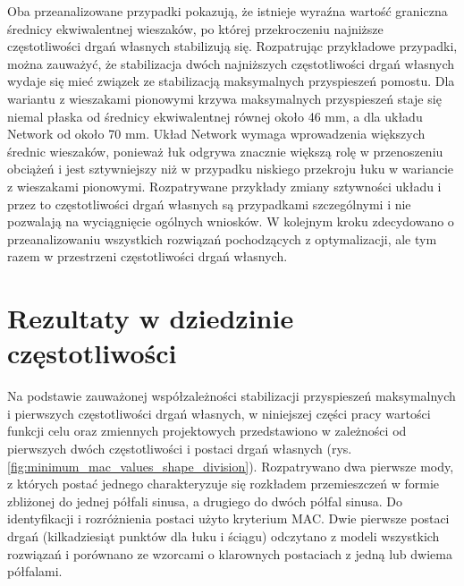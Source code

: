Oba przeanalizowane przypadki pokazują, że istnieje wyraźna wartość graniczna średnicy ekwiwalentnej wieszaków, po której przekroczeniu najniższe częstotliwości drgań własnych stabilizują się. Rozpatrując przykładowe przypadki, można zauważyć, że stabilizacja dwóch najniższych częstotliwości drgań własnych wydaje się mieć związek ze stabilizacją maksymalnych przyspieszeń pomostu. Dla wariantu z wieszakami pionowymi krzywa maksymalnych przyspieszeń staje się niemal płaska od średnicy ekwiwalentnej równej około 46 mm, a dla układu Network od około 70 mm. Układ Network wymaga wprowadzenia większych średnic wieszaków, ponieważ łuk odgrywa znacznie większą rolę w przenoszeniu obciążeń i jest sztywniejszy niż w przypadku niskiego przekroju łuku w wariancie z wieszakami pionowymi. Rozpatrywane przykłady zmiany sztywności układu i przez to częstotliwości drgań własnych są przypadkami szczególnymi i nie pozwalają na wyciągnięcie ogólnych wniosków. W kolejnym kroku zdecydowano o przeanalizowaniu wszystkich rozwiązań pochodzących z optymalizacji, ale tym razem w przestrzeni częstotliwości drgań własnych.

\section{Rezultaty w dziedzinie częstotliwości}


Na podstawie zauważonej współzależności stabilizacji przyspieszeń maksymalnych i pierwszych częstotliwości drgań własnych, w niniejszej części pracy wartości funkcji celu oraz zmiennych projektowych przedstawiono w zależności od pierwszych dwóch częstotliwości i postaci drgań własnych (rys. \ref{fig:minimum_mac_values_shape_division}). Rozpatrywano dwa pierwsze mody, z których postać jednego charakteryzuje się rozkładem przemieszczeń w formie zbliżonej do jednej półfali sinusa, a drugiego do dwóch półfal sinusa. Do identyfikacji i rozróżnienia postaci użyto kryterium MAC. Dwie pierwsze postaci drgań (kilkadziesiąt punktów dla łuku i ściągu) odczytano z modeli wszystkich rozwiązań i porównano ze wzorcami o klarownych postaciach z jedną lub dwiema półfalami. %


